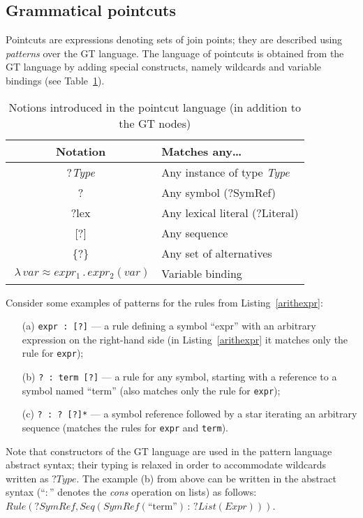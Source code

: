 \documentclass{IOS-Book-Article}     %
\newcommand{\abstr}[3]{\lambda \, #1 \approx #2 \,.\, #3}
\newcommand{\tabref}[1]{Table~\ref{#1}}
\newcommand{\lstref}[1]{Listing~\ref{#1}}
\begin{document}
\subsection{Grammatical pointcuts}

Pointcuts are expressions denoting sets of join points; they are described using \emph{patterns} over the GT language. The language of pointcuts is obtained from the GT language by adding special constructs, namely wildcards and variable bindings (see \tabref{wildcards}).
%
\begin{table}[h!]
\centering
\begin{tabular}{|@{}c|l|}
	\hline
	\bf Notation & \bf Matches any\ldots \\
	\hline
	?\emph{Type} & Any instance of type \emph{Type} \\
	? & Any symbol (?SymRef)\\
	?lex & Any lexical literal (?Literal) \\
	{}[?]& Any sequence \\
	\{?\}& Any set of alternatives \\
	$\;\abstr{var}{expr_1}{expr_2(var)}$ & Variable binding \\
	\hline
\end{tabular}
\caption{Notions introduced in the pointcut language (in addition to the GT nodes)}\label{wildcards}
\end{table}
%
Consider some examples of patterns for the rules from \lstref{arithexpr}:
\begin{itemize}
	\item[(a)] \lstinline!expr : [?]! --- a rule defining a symbol ``expr'' with an arbitrary expression on the right-hand side (in \lstref{arithexpr} it matches only the rule for \texttt{expr});
	\item[(b)] \lstinline!? : term [?]! --- a rule for any symbol, starting with a reference to a symbol named ``term'' (also matches only the rule for \texttt{expr});
	\item[(c)] \lstinline!? : ? [?]*! --- a symbol reference followed by a star iterating an arbitrary sequence (matches the rules for \texttt{expr} and \texttt{term}).
\end{itemize}
Note that constructors of the GT language are used in the pattern language abstract syntax; their typing is relaxed in order to accommodate wildcards written as $?Type$. The example (b) from above can be written in the abstract syntax (``$:$'' denotes the \emph{cons} operation on lists) as follows:\\
$Rule(?SymRef, Seq(SymRef(\mbox{``term''})\,:\,?List(Expr)))$.
\end{document}
